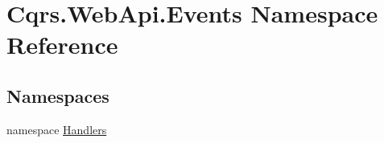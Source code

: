 \hypertarget{namespaceCqrs_1_1WebApi_1_1Events}{}\section{Cqrs.\+Web\+Api.\+Events Namespace Reference}
\label{namespaceCqrs_1_1WebApi_1_1Events}
\subsection*{Namespaces}
\begin{DoxyCompactItemize}
\item 
namespace \hyperlink{namespaceCqrs_1_1WebApi_1_1Events_1_1Handlers}{Handlers}
\end{DoxyCompactItemize}
